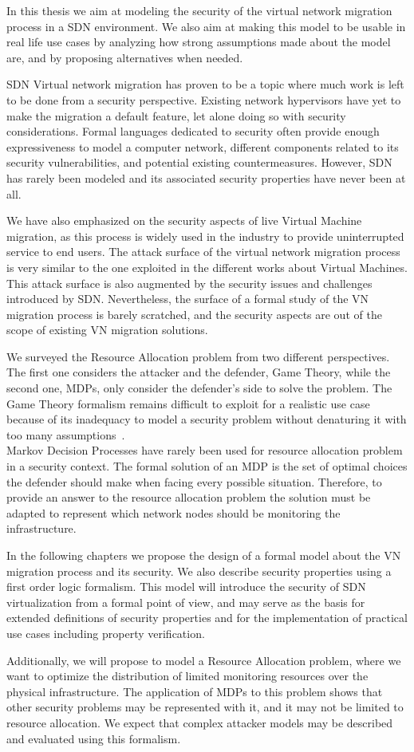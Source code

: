 In this thesis we aim at modeling the security of the virtual network migration process in a SDN environment.
We also aim at making this model to be usable in real life use cases by analyzing how strong assumptions made about the model are, and by proposing alternatives when needed.

SDN Virtual network migration has proven to be a topic where much work is left to be done from a security perspective.
Existing network hypervisors have yet to make the migration a default feature, let alone doing so with security considerations.
Formal languages dedicated to security often provide enough expressiveness to model a computer network, different components related to its security vulnerabilities, and potential existing countermeasures.
However, SDN has rarely been modeled and its associated security properties have never been at all.

We have also emphasized on the security aspects of live Virtual Machine migration, as this process is widely used in the industry to provide uninterrupted service to end users. 
The attack surface of the virtual network migration process is very similar to the one exploited in the different works about Virtual Machines. This attack surface is also augmented by the security issues and challenges introduced by SDN. Nevertheless, the surface of a formal study of the VN migration process is barely scratched, and the security aspects are out of the scope of existing VN migration solutions.

We surveyed the Resource Allocation problem from two different perspectives. The first one considers the attacker and the defender, \ie Game Theory, while the second one, \ie MDPs, only consider the defender's side to solve the problem.
The Game Theory formalism remains difficult to exploit for a realistic use case because of its inadequacy to model a security problem without denaturing it with too many assumptions~\cite{Kiennert2018}. \\
Markov Decision Processes have rarely been used for resource allocation problem in a security context. The formal solution of an MDP is the set of optimal choices the defender should make when facing every possible situation. Therefore, to provide an answer to the resource allocation problem the solution must be adapted to represent which network nodes should be monitoring the infrastructure.

In the following chapters we propose the design of a formal model about the VN migration process and its security. We also describe security properties using a first order logic formalism.
This model will introduce the security of SDN virtualization from a formal point of view, and may serve as the basis for extended definitions of security properties and for the implementation of practical use cases including property verification.

Additionally, we will propose to model a Resource Allocation problem, where we want to optimize the distribution of limited monitoring resources over the physical infrastructure.
The application of MDPs to this problem shows that other security problems may be represented with it, and it may not be limited to resource allocation. We expect that complex attacker models may be described and evaluated using this formalism.